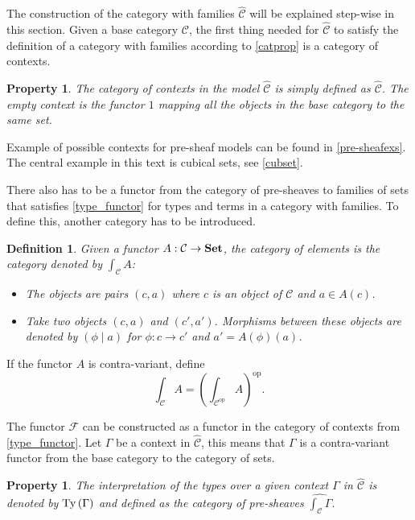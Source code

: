\documentclass[12pt,a4paper,twoside,xetex]{book} %
\newcommand{\keyword}[1]{\emph{#1}\index{#1}}
\newtheorem{definition}[theorem]{Definition}
\newtheorem{property}[theorem]{Property}
\newcommand{\psh}[1]{\widehat{#1}}
\newcommand{\coe}[2]{\int_{#1}{#2}}
\begin{document}
The construction of the category with families $\psh{\mathcal{C}}$ will be explained step-wise in this section.
Given a base category $\mathcal{C}$, the first thing needed for $\psh{\mathcal{C}}$ to satisfy the definition of a 
category with families according to \cref{catprop} is a category of contexts. 

\begin{property}\label{precon}
  The category of contexts in the model $\psh{\mathcal{C}}$ is simply defined as $\psh{\mathcal{C}}$. The empty context is 
the functor $1$ mapping all the objects in the base category to the same set. 
\end{property}

Example of possible contexts for pre-sheaf models can be found in \cref{pre-sheafexs}. The central example in this text is cubical sets, see \cref{cubset}. 

There also has to be a functor from the category of pre-sheaves to families of 
sets that satisfies \cref{type_functor} for types and terms in a category with 
families. To define this, another category has to be introduced.

\begin{definition}\label{catel}
Given a functor $A:\mathcal{C} \rightarrow \text{\textbf{Set}}$, the \keyword{category of 
elements} is the category denoted by $\int_{\mathcal{C}} A$:

\begin{itemize}
\item The objects are pairs $(c,a)$ where $c$ is an object of $\mathcal{C}$ and 
$a\in A(c)$.
\item Take two objects $(c,a)$ and $(c',a')$. Morphisms between these objects 
are denoted by $(\phi \mid a)$ for $\phi : c \rightarrow c'$ and $a' = 
A(\phi)(a)$.
\end{itemize}
\end{definition}

If the functor $A$ is contra-variant, define $$\coe{\mathcal{C}}{A} = 
\left(\coe{\mathcal{C}^{\text{op}}}{A} \right)^{\text{op}}.$$

The functor $\mathcal{F}$ can be constructed as a functor in the category of 
contexts from \cref{type_functor}. Let $\Gamma$ be a context in $\psh{\mathcal{C}}$, this means that $\Gamma$ is a contra-variant functor from the base 
category to the category of sets. 

\begin{property}\label{prety}
The interpretation of the types over a given context $\Gamma$ in $\psh{\mathcal{C}}$ is denoted by $\text{Ty}\left(\Gamma\right)$ and defined as the category of pre-sheaves $\psh{\coe{\mathcal{C}}{\Gamma}}.$
\end{property}
\end{document}

